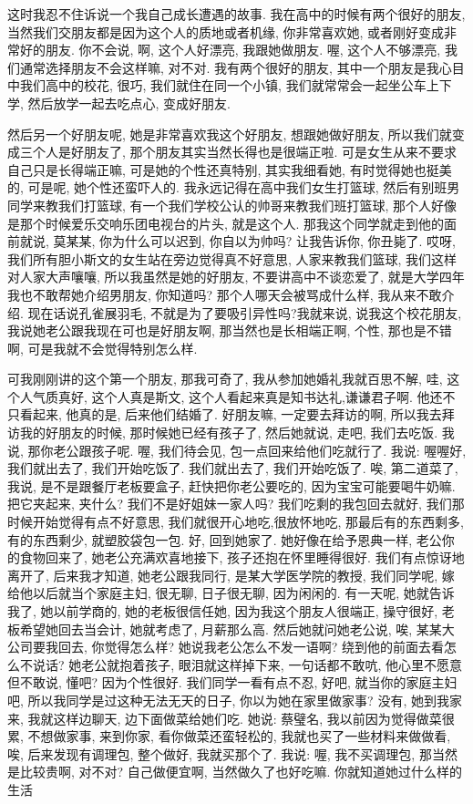 \documentclass[11pt]{article}
\begin{document}
这时我忍不住诉说一个我自己成长遭遇的故事. 我在高中的时候有两个很好的朋友, 当然我们交朋友都是因为这个人的质地或者机缘, 你非常喜欢她, 或者刚好变成非常好的朋友. 你不会说, 啊, 这个人好漂亮, 我跟她做朋友. 喔, 这个人不够漂亮, 我们通常选择朋友不会这样嘛, 对不对. 我有两个很好的朋友, 其中一个朋友是我心目中我们高中的校花, 很巧, 我们就住在同一个小镇, 我们就常常会一起坐公车上下学, 然后放学一起去吃点心, 变成好朋友. 

然后另一个好朋友呢, 她是非常喜欢我这个好朋友, 想跟她做好朋友, 所以我们就变成三个人是好朋友了, 那个朋友其实当然长得也是很端正啦. 可是女生从来不要求自己只是长得端正嘛, 可是她的个性还真特别, 其实我细看她, 有时觉得她也挺美的, 可是呢, 她个性还蛮吓人的. 我永远记得在高中我们女生打篮球, 然后有别班男同学来教我们打篮球, 有一个我们学校公认的帅哥来教我们班打篮球, 那个人好像是那个时候爱乐交响乐团电视台的片头, 就是这个人. 那我这个同学就走到他的面前就说, 莫某某, 你为什么可以迟到, 你自以为帅吗? 让我告诉你, 你丑毙了. 哎呀, 我们所有胆小斯文的女生站在旁边觉得真不好意思, 人家来教我们篮球, 我们这样对人家大声嚷嚷, 所以我虽然是她的好朋友, 不要讲高中不谈恋爱了, 就是大学四年我也不敢帮她介绍男朋友, 你知道吗? 那个人哪天会被骂成什么样, 我从来不敢介绍. 现在话说孔雀展羽毛, 不就是为了要吸引异性吗?我就来说, 说我这个校花朋友, 我说她老公跟我现在可也是好朋友啊, 那当然也是长相端正啊, 个性, 那也是不错啊, 可是我就不会觉得特别怎么样. 

可我刚刚讲的这个第一个朋友, 那我可奇了, 我从参加她婚礼我就百思不解, 哇, 这个人气质真好, 这个人真是斯文, 这个人看起来真是知书达礼,谦谦君子啊. 他还不只看起来, 他真的是, 后来他们结婚了. 好朋友嘛, 一定要去拜访的啊, 所以我去拜访我的好朋友的时候, 那时候她已经有孩子了, 然后她就说, 走吧, 我们去吃饭. 我说, 那你老公跟孩子呢. 喔, 我们待会见, 包一点回来给他们吃就行了. 我说: 喔喔好, 我们就出去了, 我们开始吃饭了. 我们就出去了, 我们开始吃饭了. 唉, 第二道菜了, 我说, 是不是跟餐厅老板要盒子, 赶快把你老公要吃的, 因为宝宝可能要喝牛奶嘛. 把它夹起来, 夹什么? 我们不是好姐妹一家人吗? 我们吃剩的我包回去就好, 我们那时候开始觉得有点不好意思, 我们就很开心地吃,很放怀地吃, 那最后有的东西剩多, 有的东西剩少, 就塑胶袋包一包. 好, 回到她家了. 她好像在给予恩典一样, 老公你的食物回来了, 她老公充满欢喜地接下, 孩子还抱在怀里睡得很好. 我们有点惊讶地离开了, 后来我才知道, 她老公跟我同行, 是某大学医学院的教授, 我们同学呢, 嫁给他以后就当个家庭主妇, 很无聊, 日子很无聊, 因为闲闲的. 有一天呢, 她就告诉我了, 她以前学商的, 她的老板很信任她, 因为我这个朋友人很端正, 操守很好, 老板希望她回去当会计, 她就考虑了, 月薪那么高. 然后她就问她老公说, 唉, 某某大公司要我回去, 你觉得怎么样? 她说我老公怎么不发一语啊? 绕到他的前面去看怎么不说话? 她老公就抱着孩子, 眼泪就这样掉下来, 一句话都不敢吭, 他心里不愿意但不敢说, 懂吧? 因为个性很好. 我们同学一看有点不忍, 好吧, 就当你的家庭主妇吧, 所以我同学是过这种无法无天的日子, 你以为她在家里做家事? 没有, 她到我家来, 我就这样边聊天, 边下面做菜给她们吃. 她说: 蔡璧名, 我以前因为觉得做菜很累, 不想做家事, 来到你家, 看你做菜还蛮轻松的, 我就也买了一些材料来做做看, 唉, 后来发现有调理包, 整个做好, 我就买那个了. 我说: 喔, 我不买调理包, 那当然是比较贵啊, 对不对? 自己做便宜啊, 当然做久了也好吃嘛. 你就知道她过什么样的生活
\end{document}
